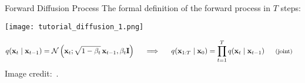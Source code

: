 \begin{refsection}
\begin{frame}{Forward Diffusion Process}
  \footnotesize
  The formal definition of the forward process in $T$ steps:
  \begin{center}
    \texttt{[image: tutorial\_diffusion\_1.png]}
  \end{center}
  \vspace{-1em}
    
    \begin{align*}
      q(\mathbf{x}_t \mid \mathbf{x}_{t-1}) &= \mathcal{N}\left(\mathbf{x}_t; \sqrt{1-\beta_t}\,\mathbf{x}_{t-1}, \beta_t \mathbf{I}\right)
      \hspace{1.5em}
      \Longrightarrow
      \hspace{1.5em}
      q(\mathbf{x}_{1:T} \mid \mathbf{x}_0) = \prod_{t=1}^T q(\mathbf{x}_t \mid \mathbf{x}_{t-1})
      \hspace{1.5em}
      \text{\footnotesize (joint)}
    \end{align*}
  \scriptsize Image credit:~\cite{CVPR2023Tutorial}.
  \bottomleftrefs
  
\end{frame}
\end{refsection}

